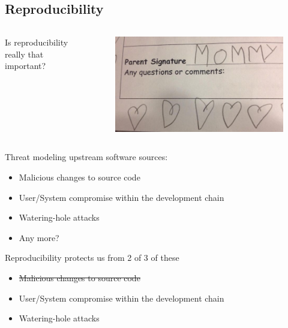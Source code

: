 \documentclass{beamer}
\begin{document}
\subsection{Reproducibility}

\begin{frame}
    \begin{columns}
        \begin{column}{0.5\textwidth}
            Is reproducibility really that important?
        \end{column}
        \begin{column}{0.5\textwidth}
            \begin{figure}
                \centering
                \includegraphics[width=\textwidth,keepaspectratio]{../resources/signature.jpg}
            \end{figure}
        \end{column}
    \end{columns}
\end{frame}

\begin{frame}
    Threat modeling upstream software sources:
    \begin{itemize}
        \item Malicious changes to source code
        \item User/System compromise within the development chain
        \item Watering-hole attacks
        \item Any more?
    \end{itemize}
\end{frame}

\begin{frame}
    Reproducibility protects us from 2 of 3 of these
    \begin{itemize}
        \item \st{Malicious changes to source code}
        \item User/System compromise within the development chain
        \item Watering-hole attacks
    \end{itemize}
\end{frame}
\end{document}
